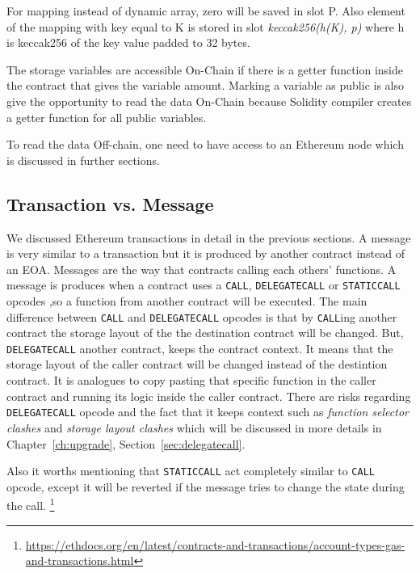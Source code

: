 For mapping instead of dynamic array, zero will be saved in slot P. Also element of the mapping with key equal to K is stored in slot \textit{keccak256(h(K), p)} where h is keccak256 of the key value padded to 32 bytes.

The storage variables are accessible On-Chain if there is a getter function inside the contract that gives the variable amount. Marking a variable as public is also give the opportunity to read the data On-Chain because Solidity compiler creates a getter function for all public variables. 

To read the data Off-chain, one need to have access to an Ethereum node which is discussed in further sections.


\subsection{Transaction vs. Message}\label{sec:txVsMsg}
We discussed Ethereum transactions in detail in the previous sections. A message is very similar to a transaction but it is produced by another contract instead of an EOA. Messages are the way that contracts calling each others' functions. A message is produces when a contract uses a \texttt{CALL}, \texttt{DELEGATECALL} or \texttt{STATICCALL} opcodes ,so a function from another contract will be executed. The main difference between \texttt{CALL} and \texttt{DELEGATECALL} opcodes is that by \texttt{CALL}ing another contract the storage layout of the the destination contract will be changed. But, \texttt{DELEGATECALL} another contract, keeps the contract context. It means that the storage layout of the caller contract will be changed instead of the destintion contract. It is analogues to copy pasting that specific function in the caller contract and running its logic inside the caller contract. There are risks regarding \texttt{DELEGATECALL} opcode and the fact that it keeps context such as \textit{function selector clashes} and \textit{storage layout clashes} which will be discussed in more details in Chapter~\ref{ch:upgrade}, Section~\ref{sec:delegatecall}.

Also it worths mentioning that \texttt{STATICCALL} act completely similar to \texttt{CALL} opcode, except it will be reverted if the message tries to change the state during the call. 
\footnote{\url{https://ethdocs.org/en/latest/contracts-and-transactions/account-types-gas-and-transactions.html}}



